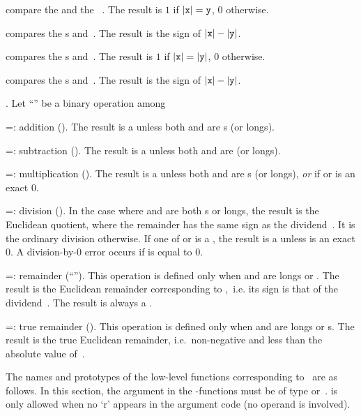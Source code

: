  compare the   and 
the ~. The result is $1$ if $|{\tt x}| = {\tt y}$, $0$
otherwise.

 compares the s  and~.
The result is the sign of $|{\tt x}| - |{\tt y}|$.

 compares the s 
and~. The result is $1$ if $|{\tt x}| = |{\tt y}|$, $0$ otherwise.

 compares the s  and~.
The result is the sign of $|{\tt x}| - |{\tt y}|$.

. Let ``\op'' be a binary operation among

\op=: addition (). The result is a  unless both
 and  are s (or longs).

\op=: subtraction (). The result is a  unless both
 and  are  (or longs).

\op=: multiplication (). The result is a 
unless both  and  are s (or longs), \emph{or} if
 or  is an exact $0$.

\op=: division (). In the case where  and 
are both s or longs, the result is the Euclidean quotient, where the
remainder has the same sign as the dividend~. It is the ordinary
division otherwise. If one of  or  is a , the result
is a  unless  is an exact $0$. A division-by-$0$ error
occurs if  is equal to $0$.

\op=: remainder (``''). This operation is defined only
when  and  are longs or . The result is the Euclidean
remainder corresponding to ,~i.e. its sign is that of the
dividend~. The result is always a .

\op=: true remainder (). This operation is defined only
when  and  are longs or s. The result is the true
Euclidean remainder, i.e.~non-negative and less than the absolute value
of~.

\noindent The names and prototypes of the low-level functions corresponding
to \op\ are as follows. In this section, the  argument in the
-functions must be of type  or~.  is only
allowed when no `r' appears in the argument code (no  operand is
involved).

